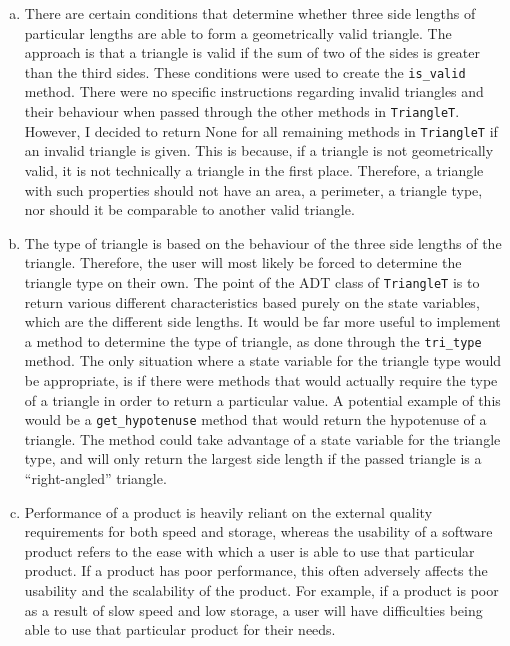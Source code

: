 \documentclass[12pt]{article}
\begin{document}
\begin{enumerate}[(a)]
\item There are certain conditions that determine whether three side lengths of particular lengths are able to form a geometrically valid triangle. The approach is that a triangle is valid if the sum of two of the sides is greater than the third sides. These conditions were used to create the \verb |is_valid| method. There were no specific instructions regarding invalid triangles and their behaviour when passed through the other methods in \verb |TriangleT|. However, I decided to return None for all remaining methods in \verb |TriangleT| if an invalid triangle is given. This is because, if a triangle is not geometrically valid, it is not technically a triangle in the first place. Therefore, a triangle with such properties should not have an area, a perimeter, a triangle type, nor should it be comparable to another valid triangle. 

\newpage 

\item The type of triangle is based on the behaviour of the three side lengths of the triangle. Therefore, the user will most likely be forced to determine the triangle type on their own. The point of the ADT class of \verb |TriangleT| is to return various different characteristics based purely on the state variables, which are the different side lengths. It would be far more useful to implement a method to determine the type of triangle, as done through the \verb |tri_type| method. The only situation where a state variable for the triangle type would be appropriate, is if there were methods that would actually require the type of a triangle in order to return a particular value. A potential example of this would be a \verb |get_hypotenuse| method that would return the hypotenuse of a triangle. The method could take advantage of a state variable for the triangle type, and will only return the largest side length if the passed triangle is a “right-angled” triangle.

\item Performance of a product is heavily reliant on the external quality requirements for both speed and storage, whereas the usability of a software product refers to the ease with which a user is able to use that particular product. If a product has poor performance, this often adversely affects the usability and the scalability of the product. For example, if a product is poor as a result of slow speed and low storage, a user will have difficulties being able to use that particular product for their needs.


\end{enumerate}
\end{document}
